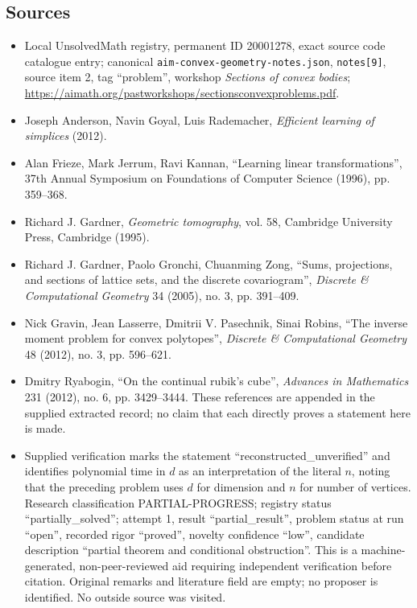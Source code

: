 \documentclass[11pt]{article}
\begin{document}
\subsection{Sources}
\begin{itemize}
\item Local UnsolvedMath registry, permanent ID 20001278, exact source code catalogue entry; canonical \texttt{aim-convex-geometry-notes.json}, \texttt{notes[9]}, source item 2, tag ``problem'', workshop \emph{Sections of convex bodies}; \url{https://aimath.org/pastworkshops/sectionsconvexproblems.pdf}.
\item [AGR] Joseph Anderson, Navin Goyal, Luis Rademacher, \emph{Efficient learning of simplices} (2012).
\item [FJK] Alan Frieze, Mark Jerrum, Ravi Kannan, ``Learning linear transformations'', 37th Annual Symposium on Foundations of Computer Science (1996), pp. 359--368.
\item [G] Richard J. Gardner, \emph{Geometric tomography}, vol. 58, Cambridge University Press, Cambridge (1995).
\item [GGZ] Richard J. Gardner, Paolo Gronchi, Chuanming Zong, ``Sums, projections, and sections of lattice sets, and the discrete covariogram'', \emph{Discrete \& Computational Geometry} 34 (2005), no. 3, pp. 391--409.
\item [GLPR] Nick Gravin, Jean Lasserre, Dmitrii V. Pasechnik, Sinai Robins, ``The inverse moment problem for convex polytopes'', \emph{Discrete \& Computational Geometry} 48 (2012), no. 3, pp. 596--621.
\item [R] Dmitry Ryabogin, ``On the continual rubik's cube'', \emph{Advances in Mathematics} 231 (2012), no. 6, pp. 3429--3444. These references are appended in the supplied extracted record; no claim that each directly proves a statement here is made.
\item Supplied verification marks the statement ``reconstructed\_unverified'' and identifies polynomial time in $d$ as an interpretation of the literal $n$, noting that the preceding problem uses $d$ for dimension and $n$ for number of vertices. Research classification PARTIAL-PROGRESS; registry status ``partially\_solved''; attempt 1, result ``partial\_result'', problem status at run ``open'', recorded rigor ``proved'', novelty confidence ``low'', candidate description ``partial theorem and conditional obstruction''. This is a machine-generated, non-peer-reviewed aid requiring independent verification before citation. Original remarks and literature field are empty; no proposer is identified. No outside source was visited.
\end{itemize}
\end{document}
